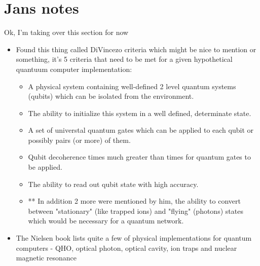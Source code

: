 \section{Jans notes}
Ok, I'm taking over this section for now
\begin{itemize}

\item
Found this thing called DiVincezo criteria which might be nice to mention or something, it's 5 criteria that need to be met for a given hypothetical quantuum computer implementation:
\begin{itemize}
    \item A physical system containing well-defined 2 level quantum systems (qubits) which can be isolated from the environment.
    \item The ability to initialize this system in a well defined, determinate state.
    \item A set of universtal quantum gates which can be applied to each qubit or possibly pairs (or more) of them.
    \item Qubit decoherence times much greater than times for quantum gates to be applied.
    \item The ability to read out qubit state with high accuracy.
    \item ** In addition 2 more were mentioned by him, the ability to convert between "stationary" (like trapped ions) and "flying" (photons) states which would be necessary for a quantum network.
\end{itemize}

\item
    The Nielsen book lists quite a few of physical implementations for quantum computers - QHO, optical photon, optical cavity, ion traps and nuclear magnetic resonance


\end{itemize}
